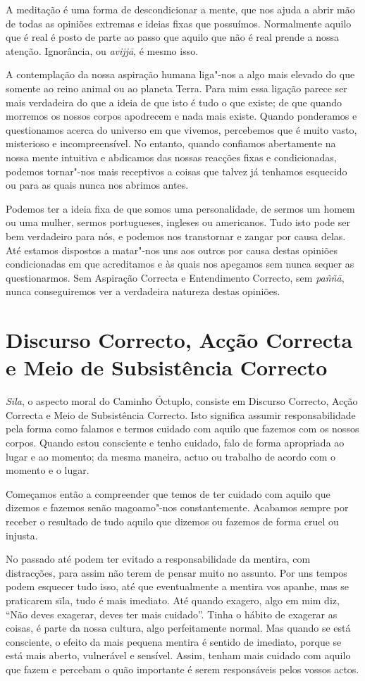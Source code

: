 A meditação é uma forma de descondicionar a mente, que nos ajuda a abrir mão de
todas as opiniões extremas e ideias fixas que possuímos. Normalmente aquilo que
é real é posto de parte ao passo que aquilo que não é real prende a nossa
atenção. Ignorância, ou \emph{avijjā}, é mesmo isso.

A contemplação da nossa aspiração humana liga"-nos a algo mais elevado do que
somente ao reino animal ou ao planeta Terra. Para mim essa ligação parece ser
mais verdadeira do que a ideia de que isto é tudo o que existe; de que quando
morremos os nossos corpos apodrecem e nada mais existe. Quando ponderamos e
questionamos acerca do universo em que vivemos, percebemos que é muito vasto,
misterioso e incompreensível. No entanto, quando confiamos abertamente na nossa
mente intuitiva e abdicamos das nossas reacções fixas e condicionadas, podemos
tornar"-nos mais receptivos a coisas que talvez já tenhamos esquecido ou para as
quais nunca nos abrimos antes.

Podemos ter a ideia fixa de que somos uma personalidade, de sermos um homem ou
uma mulher, sermos portugueses, ingleses ou americanos. Tudo isto pode ser bem
verdadeiro para nós, e podemos nos transtornar e zangar por causa delas. Até
estamos dispostos a matar"-nos uns aos outros por causa destas opiniões
condicionadas em que acreditamos e às quais nos apegamos sem nunca sequer as
questionarmos. Sem Aspiração Correcta e Entendimento Correcto, sem \emph{paññā},
nunca conseguiremos ver a verdadeira natureza destas opiniões.

\section{Discurso Correcto, Acção Correcta e Meio de Subsistência Correcto}

\emph{Sīla}, o aspecto moral do Caminho Óctuplo, consiste em Discurso Correcto,
Acção Correcta e Meio de Subsistência Correcto.  Isto significa assumir responsabilidade
pela forma como falamos e termos cuidado com aquilo que fazemos com os nossos
corpos. Quando estou consciente e tenho cuidado, falo de forma apropriada ao lugar e ao
momento; da mesma maneira, actuo ou trabalho de acordo com o momento e o lugar.

Começamos então a compreender que temos de ter cuidado com aquilo que dizemos e
fazemos senão magoamo"-nos constantemente. Acabamos sempre por receber o
resultado de tudo aquilo que dizemos ou fazemos de forma cruel ou injusta.

No passado até podem ter evitado a responsabilidade da mentira, com distracções,
para assim não terem de pensar muito no assunto. Por uns tempos podem esquecer
tudo isso, até que eventualmente a mentira vos apanhe, mas se praticarem sīla,
tudo é mais imediato. Até quando exagero, algo em mim diz, “Não deves exagerar,
deves ter mais cuidado”. Tinha o hábito de exagerar as coisas, é parte da
nossa cultura, algo perfeitamente normal. Mas quando se está consciente, o
efeito da mais pequena mentira é sentido de imediato, porque se está mais
aberto, vulnerável e sensível. Assim, tenham mais cuidado com aquilo que fazem e 
percebam o quão importante é serem responsáveis pelos vossos actos.

